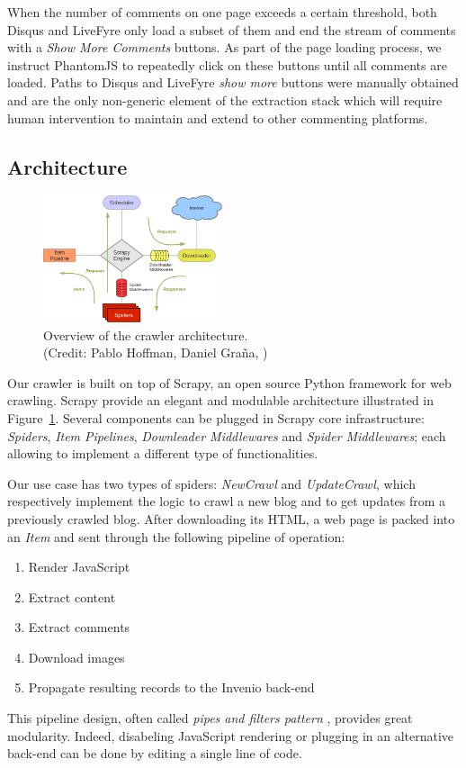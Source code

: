 When the number of comments on one page exceeds a certain threshold, both Disqus and LiveFyre only load a subset of them and end the stream of comments with a \emph{Show More Comments} buttons. As part of the page loading process, we instruct PhantomJS to repeatedly click on these buttons until all comments are loaded. Paths to Disqus and LiveFyre \emph{show more} buttons were manually obtained and are the only non-generic element of the extraction stack which will require human intervention to maintain and extend to other commenting platforms.


\subsection{Architecture}

\begin{figure}
  \capstart
  \centering
  \includegraphics[width=0.47\textwidth]{img/scrapy_architecture.png}
  \caption{Overview of the crawler architecture.\\(Credit: Pablo Hoffman, Daniel Graña, \cite{scrapy2013})}
  \label{architecture}
\end{figure}

Our crawler is built on top of Scrapy\cite{scrapy2013}, an open source Python framework for web crawling. Scrapy provide an elegant and modulable architecture illustrated in Figure~\ref{architecture}. Several components can be plugged in Scrapy core infrastructure: \emph{Spiders}, \emph{Item Pipelines}, \emph{Downleader Middlewares} and \emph{Spider Middlewares}; each allowing to implement a different type of functionalities.

Our use case has two types of spiders: \emph{NewCrawl} and \emph{UpdateCrawl}, which respectively implement the logic to crawl a new blog and to get updates from a previously crawled blog. After downloading its HTML, a web page is packed into an \emph{Item} and sent through the following pipeline of operation:
\begin{enumerate}[noitemsep]
  \item Render JavaScript
  \item Extract content
  \item Extract comments
  \item Download images
  \item Propagate resulting records to the Invenio back-end
\end{enumerate}
This pipeline design, often called \emph{pipes and filters pattern} \cite[Chapter Messaging Systems]{hohpe2003}, provides great modularity. Indeed, disabeling JavaScript rendering or plugging in an alternative back-end can be done by editing a single line of code.


